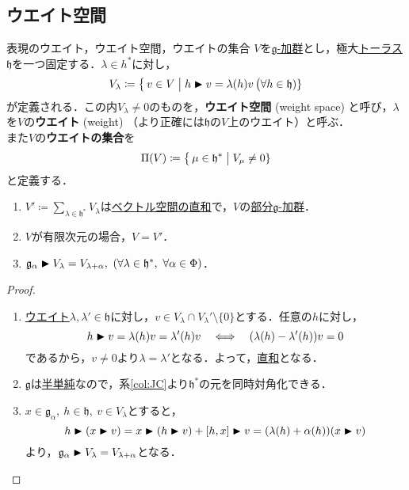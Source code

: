 \documentclass[rep_main]{subfiles}
\begin{document}
\subsection{ウエイト空間}
\begin{mydef}[label=def:weight-rep]{表現のウエイト，ウエイト空間，ウエイトの集合}
	$V$を\hyperref[ax:g-module]{$\mathfrak{g}$-加群}とし，極大\hyperref[def:toral-subLieAlg]{トーラス}$\mathfrak{h}$を一つ固定する．$\lambda \in h^*$に対し，
	\begin{align}
		V_\lambda \coloneqq \bigl\{\, v \in V \bigm| h \blacktriangleright v = \lambda(h) v \,\bigr (\forall h \in \mathfrak{h})\}
	\end{align}
	が定義される．この内$V_\lambda \neq 0$のものを，\textbf{ウエイト空間} (weight space) と呼び，$\lambda$を$V$の\textbf{ウエイト} (weight) （より正確には$\mathfrak{h}$の$V$上のウエイト）と呼ぶ．\\
	また$V$の\textbf{ウエイトの集合}を
	\begin{equation}
		\Pi(V) \coloneqq \bigl\{\, \mu \in \mathfrak{h}^* \bigm| V_\mu \neq 0\}
	\end{equation}
	と定義する．
\end{mydef}
\begin{mylem}[label=lem:weight-rep]{}
	\begin{enumerate}
		\item $V' \coloneqq \sum_{\lambda \in \mathfrak{h}^*} V_\lambda$は\hyperref[def:univ-vec-sum]{ベクトル空間の直和}で，$V$の\hyperref[def:sub-g-module]{部分$\mathfrak{g}$-加群}．
		\item $V$が有限次元の場合，$V = V'$．
		\item $\mathfrak{g}_\alpha \blacktriangleright V_\lambda = V_{\lambda + \alpha},\ (\forall \lambda \in \mathfrak{h}^*,\ \forall \alpha \in \Phi)$．
	\end{enumerate}
\end{mylem}
\begin{proof}
	\begin{enumerate}
		\item \hyperref[def:weight-rep]{ウエイト}$\lambda, \lambda' \in \mathfrak{h}$に対し，$v \in V_\lambda \cap V_\lambda' \setminus \{0\}$とする．任意の$h$に対し，
		\begin{equation}
			h \blacktriangleright v = \lambda(h)v = \lambda'(h)v  \quad \Longleftrightarrow \quad  (\lambda(h) - \lambda'(h))v = 0 
		\end{equation}
		であるから，$v \neq 0$より$\lambda = \lambda'$となる．よって，\hyperref[def:univ-vec-sum]{直和}となる．
		\item $\mathfrak{g}$は\hyperref[def:semisimple-LieAlg]{半単純}なので，系\ref{col:JC}より$\mathfrak{h}^*$の元を同時対角化できる．
		\item $x \in \mathfrak{g}_\alpha,\ h \in \mathfrak{h},\ v \in V_\lambda$とすると，
		\begin{equation}
			h \blacktriangleright (x \blacktriangleright v) = x \blacktriangleright (h \blacktriangleright v) + [h, x] \blacktriangleright v = (\lambda(h) + \alpha(h))(x \blacktriangleright v)
		\end{equation}
		より，$\mathfrak{g}_\alpha \blacktriangleright V_\lambda = V_{\lambda + \alpha}$となる．
	\end{enumerate}
\end{proof}
\end{document}
